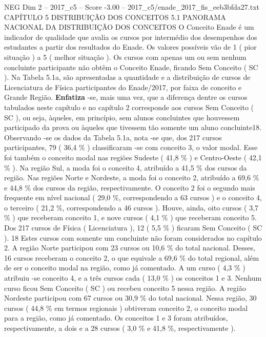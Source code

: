 \begin{textsample}{NEG Dim 2 – 2017\_c5 – Score -3.00 – 2017\_c5/enade\_2017\_fis\_eeb3bfda27.txt}  \label{ex:f2_neg_046}
CAPÍTULO 5 DISTRIBUIÇÃO DOS CONCEITOS 5.1 PANORAMA NACIONAL DA DISTRIBUIÇÃO DOS CONCEITOS O Conceito Enade é um indicador de qualidade que avalia os cursos por intermédio dos desempenhos dos estudantes a partir dos resultados do Enade.
Os valores possíveis vão de 1 ( pior situação ) a 5 ( melhor situação ).
Os cursos com apenas um ou sem nenhum concluinte participante não obtêm o Conceito Enade, ficando Sem Conceito ( SC ).
Na Tabela 5.1a, são apresentadas a quantidade e a distribuição de cursos de Licenciatura de Física participantes do Enade/2017, por faixa de conceito e Grande Região. \textbf{Enfatiza} -se, mais uma vez, que a diferença dentre os cursos tabulados neste capítulo e no capítulo 2 corresponde aos cursos Sem Conceito ( SC ), ou seja, àqueles, em princípio, sem alunos concluintes que houvessem participado da prova ou àqueles que tivessem tão somente um aluno concluinte18.
Observando -se os dados da Tabela 5.1a, nota -se que, dos 217 cursos participantes, 79 ( 36,4 \% ) classificaram -se com conceito 3, o valor modal.
Esse foi também o conceito modal nas regiões Sudeste ( 41,8 \% ) e Centro-Oeste ( 42,1 \% ).
Na região Sul, a moda foi o conceito 4, atribuído a 41,5 \% dos cursos da região.
Nas regiões Norte e Nordeste, a moda foi o conceito 2, atribuído a 69,6 \% e 44,8 \% dos cursos da região, respectivamente.
O conceito 2 foi o segundo mais frequente em nível nacional ( 29,0 \%, correspondendo a 63 cursos ) e o conceito 4, o terceiro ( 21,2 \%, correspondendo a 46 cursos ).
Houve, ainda, oito cursos ( 3,7 \% ) que receberam conceito 1, e nove cursos ( 4,1 \% ) que receberam conceito 5.
Dos 217 cursos de Física ( Licenciatura ), 12 ( 5,5 \% ) ficaram Sem Conceito ( SC ). 18 Estes cursos com somente um concluinte não foram considerados no capítulo 2.
A região Norte participou com 23 cursos ou 10,6 \% do total nacional.
Desses, 16 cursos receberam o conceito 2, o que equivale a 69,6 \% do total regional, além de ser o conceito modal na região, como já comentado.
A um curso ( 4,3 \% ) atribuiu -se conceito 4, e a três cursos cada ( 13,0 \% ) os conceitos 1 e 3.
Nenhum curso ficou Sem Conceito ( SC ) ou recebeu conceito 5 nessa região.
A região Nordeste participou com 67 cursos ou 30,9 \% do total nacional.
Nessa região, 30 cursos ( 44,8 \% em termos regionais ) obtiveram conceito 2, o conceito modal para a região, como já comentado.
Os conceitos 1 e 3 foram atribuídos, respectivamente, a dois e a 28 cursos ( 3,0 \% e 41,8 \%, respectivamente ).

\end{textsample}
